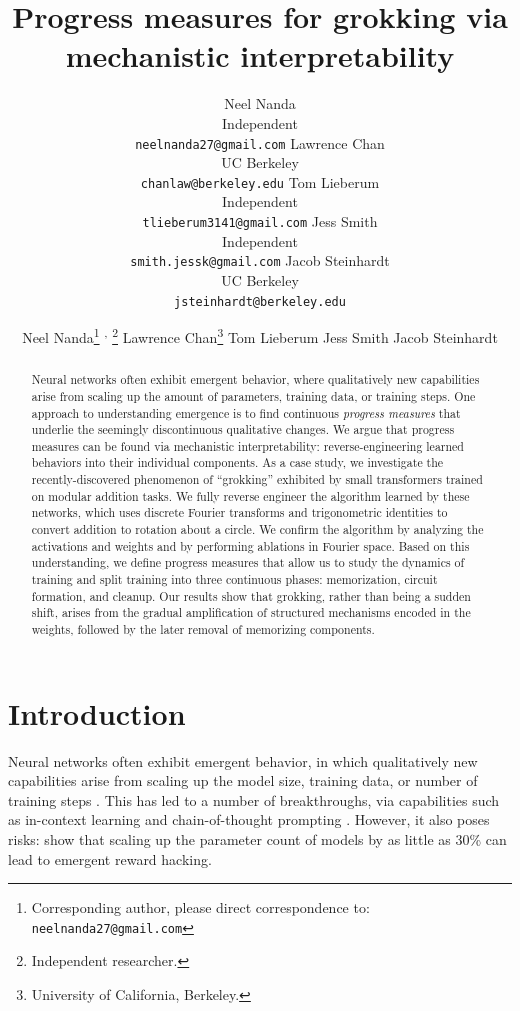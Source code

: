 \documentclass{article} %
\title{Progress measures for grokking via \\ 
mechanistic interpretability}
\author{Neel Nanda\\
    Independent\\
    \texttt{\small neelnanda27@gmail.com}
    \And
    Lawrence Chan\\
    UC Berkeley \\
    \texttt{\small  chanlaw@berkeley.edu}
    \And
    Tom Lieberum\\
    Independent \\
    \texttt{\small tlieberum3141@gmail.com}
    \And 
    Jess Smith\\
    Independent \\
    \texttt{\small smith.jessk@gmail.com}
    \And 
    Jacob Steinhardt\\
    UC Berkeley\\
    \texttt{\small jsteinhardt@berkeley.edu}
    }
\author{
    Neel Nanda\thanks{Corresponding author, please direct correspondence to: \texttt{\small neelnanda27@gmail.com}} \textsuperscript{ , }\thanks{Independent researcher.}
    \And
    Lawrence Chan\thanks{University of California, Berkeley.}
    \And
    Tom Lieberum\footnotemark[2]
    \And 
    Jess Smith\footnotemark[2]
    \And 
    Jacob Steinhardt\footnotemark[3] 
    }
\begin{document}
\maketitle

\begin{abstract}
Neural networks often exhibit emergent behavior, where qualitatively new capabilities arise from scaling up the amount of parameters, training data, or training steps. One approach to understanding emergence is to find continuous \textit{progress measures} that underlie the seemingly discontinuous qualitative changes. We argue that progress measures can be found via mechanistic interpretability: reverse-engineering learned behaviors into their individual components.
As a case study, we investigate the recently-discovered phenomenon of ``grokking'' exhibited by small transformers trained on modular addition tasks. We fully reverse engineer the algorithm learned by these networks, which uses discrete Fourier transforms and trigonometric identities to convert addition to rotation about a circle. We confirm the algorithm by analyzing the activations and weights and by performing ablations in Fourier space.  Based on this understanding, we define progress measures that allow us to study the dynamics of training and split training into three continuous phases: memorization, circuit formation, and cleanup.
Our results show that grokking, rather than being a sudden shift, arises from the gradual amplification of structured mechanisms encoded in the weights, followed by the later removal of memorizing components. %
\end{abstract}

\section{Introduction}
\label{sec:intro}

Neural networks often exhibit emergent behavior, in which qualitatively new capabilities %
arise from scaling up the model size, training data, or number of training steps \citep{steinhardt2022more, wei2022emergent}.
This has led to a number of breakthroughs, via capabilities such as in-context learning \citep{radford2019language, brown2020language} and chain-of-thought prompting \citep{wei2022chain}.
However, it also poses risks: \cite{pan2022effects} show that scaling up the parameter count of models by as little as 30\% can lead to emergent reward hacking. 
\end{document}
